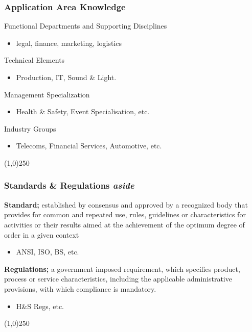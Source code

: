 \begin{frame}
\frametitle{Application Area Knowledge}
Functional Departments and Supporting Disciplines \\
	\begin{itemize}
	\item legal, finance, marketing, logistics
	\end{itemize}
Technical Elements \\
	\begin{itemize}
	\item Production, IT, Sound \& Light.
	\end{itemize}
Management Specialization \\
	\begin{itemize}
	\item Health \& Safety, Event Specialisation, etc.
	\end{itemize}
Industry Groups \\
	\begin{itemize}
	\item Telecoms, Financial Services, Automotive, etc.
	\end{itemize}
\end{frame}
\begin{center}\line(1,0){250}\end{center}



\begin{frame}
\frametitle{Standards \& Regulations \hfill \textit{aside}}
\textbf{Standard;} established by consensus and approved by a recognized body that provides for common and repeated use, rules, guidelines or characteristics for activities or their results aimed at the achievement of the optimum degree of order in a given context\\
\begin{itemize}
\item ANSI, ISO, BS, etc.
\end{itemize}

\textbf{Regulations;} a government imposed requirement, which specifies product, process or service characteristics, including the applicable administrative provisions, with which compliance is mandatory.\\
\begin{itemize}
\item H\&S Regs, etc. 
\end{itemize}
\end{frame}
\begin{center}\line(1,0){250}\end{center}



